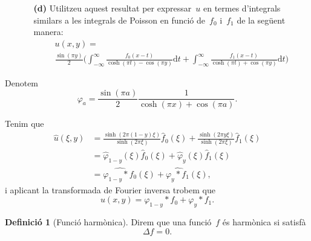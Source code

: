 \documentclass[a4paper]{article}
\theoremstyle{plain}
\theoremstyle{definition}
\newtheorem{definition}{Definició}
\providecommand{\uppi}{\pi}
\newcommand{\diff}{\mathrm{d}}
\begin{document}
\begin{enumerate}
    \item[]\begin{enumerate}
        \item[\textbf{(d)}] Utilitzeu aquest resultat per expressar~\(u\) en
            termes d'integrals similars a les integrals de Poisson en funció
            de~\(f_{0}\) i~\(f_{1}\) de la següent manera:
            \begin{multline*}
                u(x,y)
                = \\
                \frac{\sin(\uppi y)}{2}
                \biggl(
                    \int_{-\infty}^{\infty}
                    \frac{f_{0}(x-t)}{\cosh(\uppi t)-\cos(\uppi y)}
                    \diff t
                    +
                    \int_{-\infty}^{\infty}
                    \frac{f_{1}(x-t)}{\cosh(\uppi t)+\cos(\uppi y)}
                    \diff t
                \biggr)
            \end{multline*}
    \end{enumerate}
\end{enumerate}

Denotem
\[
    \varphi_{a}
    =
    \frac{\sin(\uppi a)}{2}
    \frac{1}{\cosh(\uppi x) + \cos(\uppi a)}.
\]

Tenim que
\begin{align*}
    \widehat{u}(\xi,y) &= \frac{\sinh(2\uppi(1-y)\xi)}{\sinh(2\uppi\xi)}
                          \widehat{f}_{0}(\xi)
                          +
                          \frac{\sinh(2\uppi y\xi)}{\sinh(2\uppi\xi)}
                          \widehat{f}_{1}(\xi) \\
                       &= \widehat{\varphi}_{1-y}(\xi)
                          \widehat{f}_{0}(\xi)
                          +
                          \widehat{\varphi}_{y}(\xi)
                          \widehat{f}_{1}(\xi) \\
                       &= \widehat{\varphi_{1-y}\ast f_{0}}(\xi)
                          +
                          \widehat{\varphi_{y}\ast f_{1}}(\xi),
\end{align*}
i aplicant la transformada de Fourier inversa trobem que
\[
    u(x,y)
    =
    \varphi_{1-y}\ast f_{0}
    +
    \varphi_{y}\ast f_{1}.
\]

\begin{definition}[Funció harmònica]
    Direm que una funció~\(f\) és harmònica si satisfà
    \[
        \Delta f = 0.
    \]
\end{definition}
\end{document}
